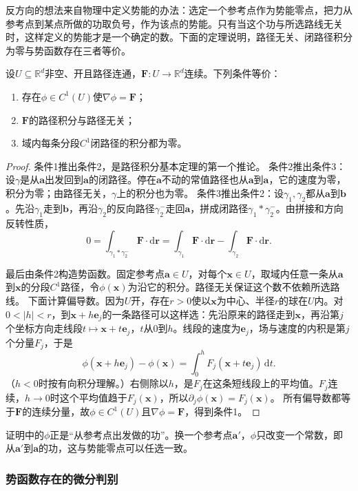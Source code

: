 反方向的想法来自物理中定义势能的办法：选定一个参考点作为势能零点，把力从参考点到某点所做的功取负号，作为该点的势能。只有当这个功与所选路线无关时，这样定义的势能才是一个确定的数。下面的定理说明，路径无关、闭路径积分为零与势函数存在三者等价。
\begin{theorem}[路径无关的等价条件]
设$U\subseteq\mathbb R^d$非空、开且路径连通，$\bm F:U\to\mathbb R^d$连续。下列条件等价：
\begin{enumerate}
 \item 存在$\phi\in C^1(U)$使$\nabla\phi=\bm F$；
 \item $\bm F$的路径积分与路径无关；
 \item 域内每条分段$C^1$闭路径的积分都为零。
\end{enumerate}
\end{theorem}
\begin{proof}
条件1推出条件2，是路径积分基本定理的第一个推论。
条件2推出条件3：设$\gamma$是从$\bm a$出发回到$\bm a$的闭路径。停在$\bm a$不动的常值路径也从$\bm a$到$\bm a$，它的速度为零，积分为零；由路径无关，$\gamma$上的积分也为零。
条件3推出条件2：设$\gamma_1,\gamma_2$都从$\bm a$到$\bm b$。先沿$\gamma_1$走到$\bm b$，再沿$\gamma_2$的反向路径$\gamma_2^-$走回$\bm a$，拼成闭路径$\gamma_1*\gamma_2^-$。由拼接和方向反转性质，
\[
 0=\int_{\gamma_1*\gamma_2^-}\bm F\cdot\mathrm d\bm r
 =\int_{\gamma_1}\bm F\cdot\mathrm d\bm r-\int_{\gamma_2}\bm F\cdot\mathrm d\bm r.
\]

最后由条件2构造势函数。固定参考点$\bm a\in U$，对每个$\bm x\in U$，取域内任意一条从$\bm a$到$\bm x$的分段$C^1$路径，令$\phi(\bm x)$为沿它的积分。路径无关保证这个数不依赖所选路线。
下面计算偏导数。因为$U$开，存在$r>0$使以$\bm x$为中心、半径$r$的球在$U$内。对$0<|h|<r$，到$\bm x+h\bm e_j$的一条路径可以这样选：先沿原来的路径走到$\bm x$，再沿第$j$个坐标方向走线段$t\mapsto\bm x+t\bm e_j$，$t$从$0$到$h$。线段的速度为$\bm e_j$，场与速度的内积是第$j$个分量$F_j$，于是
\[
 \phi(\bm x+h\bm e_j)-\phi(\bm x)
 =\int_0^h F_j(\bm x+t\bm e_j)\,\mathrm dt.
\]
（$h<0$时按有向积分理解。）右侧除以$h$，是$F_j$在这条短线段上的平均值。$F_j$连续，$h\to0$时这个平均值趋于$F_j(\bm x)$，所以$\partial_j\phi(\bm x)=F_j(\bm x)$。
所有偏导数都等于$\bm F$的连续分量，故$\phi\in C^1(U)$且$\nabla\phi=\bm F$，得到条件1。
\end{proof}

证明中的$\phi$正是“从参考点出发做的功”。换一个参考点$\bm a'$，$\phi$只改变一个常数，即从$\bm a'$到$\bm a$的功，这与势能零点可以任选一致。

\subsubsection{势函数存在的微分判别}

